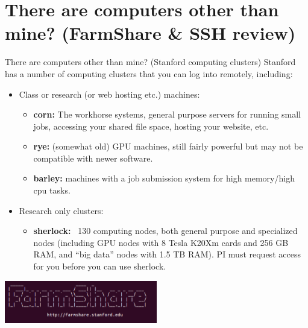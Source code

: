 \documentclass{beamer}
\begin{document}
\section{There are computers other than mine? (FarmShare \& SSH review)}
\begin{frame}{There are computers other than mine? (Stanford computing clusters)}
Stanford has a number of computing clusters that you can log into remotely, including:
\begin{itemize}
    \item Class or research (or web hosting etc.) machines:
    \begin{itemize}
	\item<1-> \textbf{corn:} The workhorse systems, general purpose servers for running small jobs, accessing your shared file space, hosting your website, etc.
	\item<2-> \textbf{rye:} (somewhat old) GPU machines, still fairly powerful but may not be compatible with newer software. 
	\item<3-> \textbf{barley:} machines with a job submission system for high memory/high cpu tasks.
    \end{itemize}
    \item<4-> Research only clusters:
    \begin{itemize}
	\item<4-> \textbf{sherlock:} ~130 computing nodes, both general purpose and specialized nodes (including GPU nodes with 8 Tesla K20Xm cards and 256 GB RAM, and ``big data'' nodes with 1.5 TB RAM). {\color{red} PI must request access for you before you can use sherlock.}
    \end{itemize}
\end{itemize}
\begin{center}\vspace{0em}\includegraphics[width = 0.5\textwidth]{images/farmshare.png}\end{center}
\end{frame}
\end{document}
